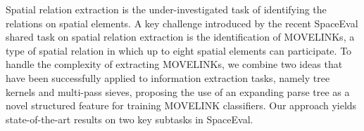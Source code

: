 Spatial relation extraction is the under-investigated task of identifying the relations on spatial elements. A key challenge introduced by the recent SpaceEval shared task on spatial relation extraction is the identification of MOVELINKs, a type of spatial relation in which up to eight spatial elements can participate. To handle the complexity of extracting MOVELINKs, we combine two ideas that have been successfully applied to information extraction tasks, namely tree kernels and multi-pass sieves, proposing the use of an expanding parse tree as a novel structured feature for training MOVELINK classifiers. Our approach yields state-of-the-art results on two key subtasks in SpaceEval.

